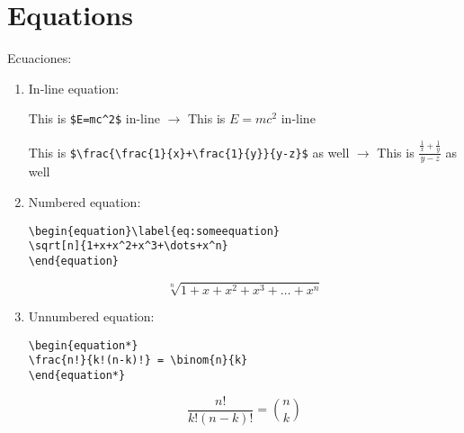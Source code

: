 \section{Equations}\label{sec:Elements_equations}
Ecuaciones:

\begin{enumerate}

\item In-line equation:

This is \lstinline"$E=mc^2$" in-line $\rightarrow$ This is $E=mc^2$ in-line

This is \lstinline"$\frac{\frac{1}{x}+\frac{1}{y}}{y-z}$" as well $\rightarrow$ This is $\frac{\frac{1}{x}+\frac{1}{y}}{y-z}$ as well\\

\item Numbered equation:

\begin{lstlisting}
\begin{equation}\label{eq:someequation}
\sqrt[n]{1+x+x^2+x^3+\dots+x^n}
\end{equation}
\end{lstlisting}

\begin{equation}\label{eq:someequation}
\sqrt[n]{1+x+x^2+x^3+\dots+x^n}
\end{equation}

\item Unnumbered equation:

\begin{lstlisting}
\begin{equation*}
\frac{n!}{k!(n-k)!} = \binom{n}{k}
\end{equation*}
\end{lstlisting}

\begin{equation*}
\frac{n!}{k!(n-k)!} = \binom{n}{k}
\end{equation*}
\end{enumerate}